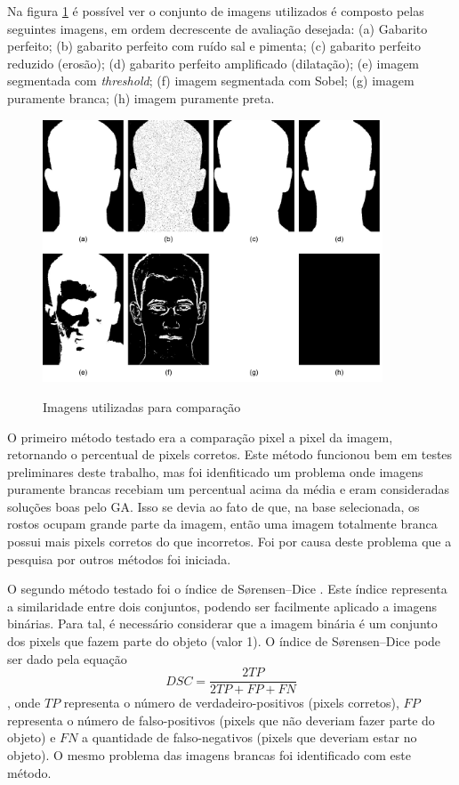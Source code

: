 \documentclass[12pt,oneside,a4paper,english,french,spanish,brazil,]{abntex2}
\begin{document}
Na figura \ref{fig:DES_Imagens_Teste} é possível ver o conjunto de imagens utilizados é composto pelas seguintes imagens, em ordem decrescente de avaliação desejada: (a) Gabarito perfeito; (b) gabarito perfeito com ruído sal e pimenta; (c) gabarito perfeito reduzido (erosão); (d) gabarito perfeito amplificado (dilatação); (e) imagem segmentada com \textit{threshold}; (f) imagem segmentada com Sobel; (g) imagem puramente branca; (h) imagem puramente preta.

\begin{figure}[ht]
\centering
\caption{Imagens utilizadas para comparação}
\includegraphics[width=0.9\textwidth]{imagens/DES_Imagens_Teste.pdf}
\sourceAuthor{}
\label{fig:DES_Imagens_Teste}
\end{figure}

O primeiro método testado era a comparação pixel a pixel da imagem, retornando o percentual de pixels corretos. Este método funcionou bem em testes preliminares deste trabalho, mas foi idenfiticado um problema onde imagens puramente brancas recebiam um percentual acima da média e eram consideradas soluções boas pelo GA. Isso se devia ao fato de que, na base selecionada, os rostos ocupam grande parte da imagem, então uma imagem totalmente branca possui mais pixels corretos do que incorretos. Foi por causa deste problema que a pesquisa por outros métodos foi iniciada.

O segundo método testado foi o índice de Sørensen–Dice \cite{sorensen:1948}\cite{dice:1945}. Este índice representa a similaridade entre dois conjuntos, podendo ser facilmente aplicado a imagens binárias. Para tal, é necessário considerar que a imagem binária é um conjunto dos pixels que fazem parte do objeto (valor 1). O índice de Sørensen–Dice pode ser dado pela equação \[DSC = \frac{2TP}{2TP + FP + FN}\], onde \(TP\) representa o número de verdadeiro-positivos (pixels corretos), \(FP\) representa o número de falso-positivos (pixels que não deveriam fazer parte do objeto) e \(FN\) a quantidade de falso-negativos (pixels que deveriam estar no objeto). O mesmo problema das imagens brancas foi identificado com este método.
\end{document}
